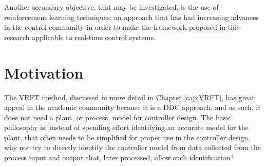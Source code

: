 Another secondary objective, that may be investigated, is the use of reinforcement learning techniques, an approach that has had increasing advances in the control community in order to make the framework proposed in this research applicable to real-time control systems.




\section{Motivation}%
\label{sec:motivation}


The VRFT method, discussed in more detail in Chapter \ref{cap:VRFT}, has great appeal in the academic community because it is a DDC approach, and as such, it does not need a plant, or process, model for controller design. The basic philosophy is: instead of spending effort identifying an accurate model for the plant, that often needs to be simplified for proper use in the controller design, why not try to directly identify the controller model from data collected from the process input and output that, later processed, allow such identification?

